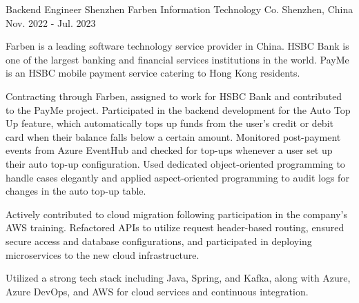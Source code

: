 \begin{cventries}
  \cventry
    {Backend Engineer} %
    {Shenzhen Farben Information Technology Co.} %
    {Shenzhen, China} %
    {Nov. 2022 - Jul. 2023} %
    {
      \begin{cvitems} %
        \item {Farben is a leading software technology service provider in China. HSBC Bank is one of the largest banking and financial services institutions in the world. PayMe is an HSBC mobile payment service catering to Hong Kong residents.}
        \item {Contracting through Farben, assigned to work for HSBC Bank and contributed to the PayMe project. Participated in the backend development for the Auto Top Up feature, which automatically tops up funds from the user's credit or debit card when their balance falls below a certain amount. Monitored post-payment events from Azure EventHub and checked for top-ups whenever a user set up their auto top-up configuration. Used dedicated object-oriented programming to handle cases elegantly and applied aspect-oriented programming to audit logs for changes in the auto top-up table.}
        \item {Actively contributed to cloud migration following participation in the company's AWS training. Refactored APIs to utilize request header-based routing, ensured secure access and database configurations, and participated in deploying microservices to the new cloud infrastructure.}
        \item {Utilized a strong tech stack including Java, Spring, and Kafka, along with Azure, Azure DevOps, and AWS for cloud services and continuous integration.}
      \end{cvitems}
    }


\end{cventries}
